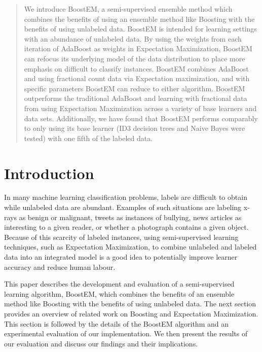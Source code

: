 \documentclass{sig-alternate}
\begin{document}
\maketitle
\begin{abstract}
We introduce BoostEM, a semi-supervised ensemble method which combines the benefits of using an ensemble method like Boosting with the benefits of using unlabeled data.  BoostEM is intended for learning settings with an abundance of unlabeled data. By using the weights from each iteration of AdaBoost as weights in Expectation Maximization, BoostEM can refocus its underlying model of the data distribution to place more emphasis on difficult to classify instances. BoostEM combines AdaBoost and using fractional count data via Expectation maximization, and with specific parameters BoostEM can reduce to either algorithm.  BoostEM  outperforms the traditional AdaBoost  and learning with fractional data from using Expectation Maximization across a variety of base learners and data sets.  Additionally, we have found that BoostEM performs comparably to only using its base learner (ID3 decision trees and Naive Bayes were tested) with one fifth of the labeled data.  
\end{abstract}

\section{Introduction}

In many machine learning classification problems, labels are difficult to obtain while unlabeled data are abundant. Examples of such situations are labeling x-rays as benign or malignant, tweets as instances of bullying, news articles as interesting to a given reader, or whether a photograph contains a given object. Because of this scarcity of labeled instances, using semi-supervised learning techniques, such as Expectation Maximization, to combine unlabeled and labeled data into an integrated model is a good idea to potentially improve learner accuracy and reduce human labour.

This paper describes the development and evaluation of a semi-supervised learning algorithm, BoostEM, which combines the benefits of an ensemble method like Boosting with the benefits of using unlabeled data. The next section provides an overview of related work on Boosting and Expectation Maximization. This section is followed by the details of the BoostEM algorithm and an experimental evaluation of our implementation. We then present the results of our evaluation and discuss our findings and their implications.
\end{document}
